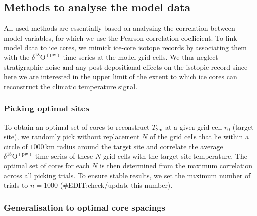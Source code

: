 \documentclass[cp, manuscript]{copernicus}
\begin{document}
\subsection{Methods to analyse the model data}\label{methods:main}

All used methods are essentially based on analysing the correlation between
model variables, for which we use the Pearson correlation coefficient. To link
model data to ice cores, we mimick ice-core isotope records by associating them
with the $\delta^{18}\mathrm{O}^{\mathrm{(pw)}}$ time series at the model grid
cells. We thus neglect stratigraphic noise and any post-depositional effects on
the isotopic record since here we are interested in the upper limit of the
extent to which ice cores can reconstruct the climatic temperature signal.

\subsubsection{Picking optimal sites}\label{methods:picking}

To obtain an optimal set of cores to reconstruct $T_{2\mathrm{m}}$ at a given
grid cell $r_0$ (target site), we randomly pick without replacement $N$ of the
grid cells that lie within a circle of $1000$\,km radius around the target site
and correlate the average $\delta^{18}\mathrm{O}^{\mathrm{(pw)}}$ time series of
these $N$ grid cells with the target site temperature. The optimal set of cores
for each $N$ is then determined from the maximum correlation across all picking
trials. To ensure stable results, we set the maximum number of trials to
$n=1000$ (\#EDIT:check/update this number).

\subsubsection{Generalisation to optimal core spacings}\label{methods:general}
\end{document}
